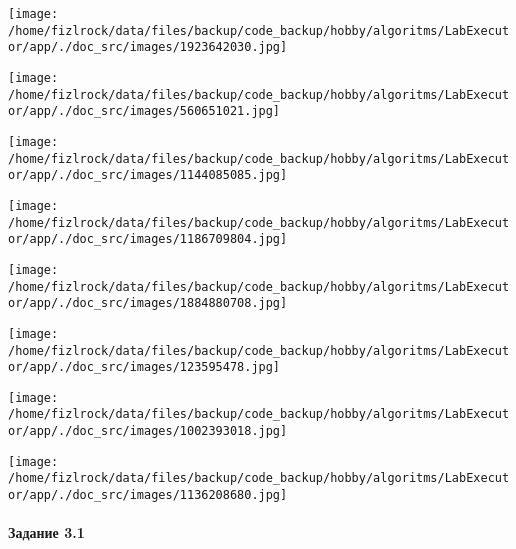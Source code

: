 \documentclass[a4paper, 12pt]{article}
\begin{document}
\texttt{[image: /home/fizlrock/data/files/backup/code\_backup/hobby/algoritms/LabExecutor/app/./doc\_src/images/1923642030.jpg]}

\texttt{[image: /home/fizlrock/data/files/backup/code\_backup/hobby/algoritms/LabExecutor/app/./doc\_src/images/560651021.jpg]}

\texttt{[image: /home/fizlrock/data/files/backup/code\_backup/hobby/algoritms/LabExecutor/app/./doc\_src/images/1144085085.jpg]}

\texttt{[image: /home/fizlrock/data/files/backup/code\_backup/hobby/algoritms/LabExecutor/app/./doc\_src/images/1186709804.jpg]}

\texttt{[image: /home/fizlrock/data/files/backup/code\_backup/hobby/algoritms/LabExecutor/app/./doc\_src/images/1884880708.jpg]}

\texttt{[image: /home/fizlrock/data/files/backup/code\_backup/hobby/algoritms/LabExecutor/app/./doc\_src/images/123595478.jpg]}

\texttt{[image: /home/fizlrock/data/files/backup/code\_backup/hobby/algoritms/LabExecutor/app/./doc\_src/images/1002393018.jpg]}

\texttt{[image: /home/fizlrock/data/files/backup/code\_backup/hobby/algoritms/LabExecutor/app/./doc\_src/images/1136208680.jpg]}
\pagebreak
\paragraph{Задание 3.1}
\end{document}
